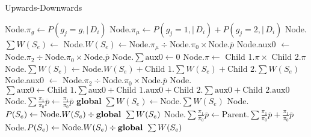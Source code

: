 \documentclass[../../main.tex]{subfiles}
\begin{document}
\begin{algorithm}
    \caption{Upwards-Downwards}
    \begin{algorithmic}[5]
            \State Node.$\pi_g \gets P(g_j = g,\mid\,D_i)$
            \State Node.$\pi_\mu \gets P(g_j=1,\mid\,D_i) + P(g_j=2,\mid\,D_i)$
            \State Node.$\sum W(S_e) \gets$ Node.$W(S_e) \gets \text{Node.}\pi_\mu\div \text{Node.}\pi_0\times\text{Node.}\overline{p}$ 
            \State Node.aux0 $\gets$ Node.$\pi_2\div\text{Node.}\pi_0\times\text{Node.}\overline{p}$
            \State Node.$\sum\text{aux0}\gets 0$
        \Else
            \State {}
            \State {}
            \State Node.$\pi \gets$ Child 1.$\pi\times$ Child 2.$\pi$
            \State Node.$\sum W(S_e) \gets \text{Node.}W(S_e) + \text{Child 1.}\sum  W(S_e)+ \text{Child 2.}\sum W(S_e)$
            \State Node.aux0 $\gets$ Node.$\pi_2\div\text{Node.}\pi_0\times\text{Node.}\overline{p}$
            \State Node.$\sum\text{aux0} \gets \text{Child 1.}\sum\text{aux0} + \text{Child 1.aux0} + \text{Child 2.}\sum\text{aux0} + \text{Child 2.aux0}$
        \EndIf
        \EndProcedure
            \State Node.$\sum \frac{\pi_1}{\pi_0}\overline{p} \gets \frac{\pi_1}{\pi_0}\overline{p}$
            \State \textbf{global} $\sum W(S_e) \gets \text{Node.}\sum W(S_e)$
            \State Node.$P(S_e) \gets \text{Node.}W(S_e) \div \text{\textbf{global }} \sum W(S_e)$
            \State {}
            \State {}
        \Else
            \State Node.$\sum \frac{\pi_1}{\pi_0}\overline{p} \gets \text{Parent.}\sum \frac{\pi_1}{\pi_0}\overline{p} + \frac{\pi_1}{\pi_0}\overline{p}$
            \State Node.$P(S_e) \gets \text{Node.}W(S_e) \div \text{\textbf{global }} \sum W(S_e)$
            \State {}
            \State {}
            \EndIf
        \EndIf
        \EndProcedure
        \State {}
        \State {}
    \end{algorithmic}
\end{algorithm}
\end{document}
